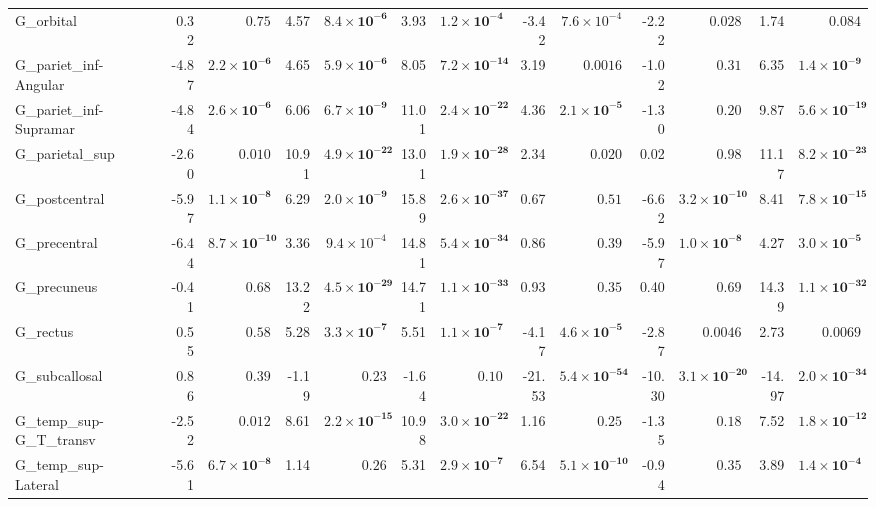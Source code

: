 {\begin{longtable}{llrrrrrrrrrrrr}
G\_orbital &  & 0.32 & $0.75$ & 4.57 & $\mathbf{8.4{\times}10^{-6}}$ & 3.93 & $\mathbf{1.2{\times}10^{-4}}$ & -3.42 & $7.6{\times}10^{-4}$ & -2.22 & $0.028$ & 1.74 & $0.084$ \\
G\_pariet\_inf-Angular &  & -4.87 & $\mathbf{2.2{\times}10^{-6}}$ & 4.65 & $\mathbf{5.9{\times}10^{-6}}$ & 8.05 & $\mathbf{7.2{\times}10^{-14}}$ & 3.19 & $0.0016$ & -1.02 & $0.31$ & 6.35 & $\mathbf{1.4{\times}10^{-9}}$ \\
G\_pariet\_inf-Supramar &  & -4.84 & $\mathbf{2.6{\times}10^{-6}}$ & 6.06 & $\mathbf{6.7{\times}10^{-9}}$ & 11.01 & $\mathbf{2.4{\times}10^{-22}}$ & 4.36 & $\mathbf{2.1{\times}10^{-5}}$ & -1.30 & $0.20$ & 9.87 & $\mathbf{5.6{\times}10^{-19}}$ \\
G\_parietal\_sup &  & -2.60 & $0.010$ & 10.91 & $\mathbf{4.9{\times}10^{-22}}$ & 13.01 & $\mathbf{1.9{\times}10^{-28}}$ & 2.34 & $0.020$ & 0.02 & $0.98$ & 11.17 & $\mathbf{8.2{\times}10^{-23}}$ \\
G\_postcentral &  & -5.97 & $\mathbf{1.1{\times}10^{-8}}$ & 6.29 & $\mathbf{2.0{\times}10^{-9}}$ & 15.89 & $\mathbf{2.6{\times}10^{-37}}$ & 0.67 & $0.51$ & -6.62 & $\mathbf{3.2{\times}10^{-10}}$ & 8.41 & $\mathbf{7.8{\times}10^{-15}}$ \\
G\_precentral &  & -6.44 & $\mathbf{8.7{\times}10^{-10}}$ & 3.36 & $9.4{\times}10^{-4}$ & 14.81 & $\mathbf{5.4{\times}10^{-34}}$ & 0.86 & $0.39$ & -5.97 & $\mathbf{1.0{\times}10^{-8}}$ & 4.27 & $\mathbf{3.0{\times}10^{-5}}$ \\
G\_precuneus &  & -0.41 & $0.68$ & 13.22 & $\mathbf{4.5{\times}10^{-29}}$ & 14.71 & $\mathbf{1.1{\times}10^{-33}}$ & 0.93 & $0.35$ & 0.40 & $0.69$ & 14.39 & $\mathbf{1.1{\times}10^{-32}}$ \\
G\_rectus &  & 0.55 & $0.58$ & 5.28 & $\mathbf{3.3{\times}10^{-7}}$ & 5.51 & $\mathbf{1.1{\times}10^{-7}}$ & -4.17 & $\mathbf{4.6{\times}10^{-5}}$ & -2.87 & $0.0046$ & 2.73 & $0.0069$ \\
G\_subcallosal &  & 0.86 & $0.39$ & -1.19 & $0.23$ & -1.64 & $0.10$ & -21.53 & $\mathbf{5.4{\times}10^{-54}}$ & -10.30 & $\mathbf{3.1{\times}10^{-20}}$ & -14.97 & $\mathbf{2.0{\times}10^{-34}}$ \\
G\_temp\_sup-G\_T\_transv &  & -2.52 & $0.012$ & 8.61 & $\mathbf{2.2{\times}10^{-15}}$ & 10.98 & $\mathbf{3.0{\times}10^{-22}}$ & 1.16 & $0.25$ & -1.35 & $0.18$ & 7.52 & $\mathbf{1.8{\times}10^{-12}}$ \\
G\_temp\_sup-Lateral &  & -5.61 & $\mathbf{6.7{\times}10^{-8}}$ & 1.14 & $0.26$ & 5.31 & $\mathbf{2.9{\times}10^{-7}}$ & 6.54 & $\mathbf{5.1{\times}10^{-10}}$ & -0.94 & $0.35$ & 3.89 & $\mathbf{1.4{\times}10^{-4}}$ \\

\end{longtable}}
